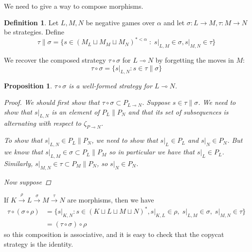 \documentclass[11pt]{article} %
\theoremstyle{plain} %
\newtheorem{proposition}[theorem]{Proposition}
\theoremstyle{definition} %
\newtheorem{definition}[theorem]{Definition}
\theoremstyle{exercisestyle}
\newcommand{\map}[3]{#2\xrightarrow{#1} #3}
\newcommand*\from{\colon}
\newcommand{\cmap}[3]{#1\from{}#2\to{}#3}
\renewcommand{\implies}{\multimap}
\newcommand{\comp}{\circ}
\newcommand{\cprd}{\sqcup}
\newcommand{\suchthat}{\;\colon\;}
\begin{document}
We need to give a way to compose morphisms.

\begin{definition}
  Let $L,M,N$ be negative games over $\alpha$ and let $\cmap{\sigma}{L}{M},\cmap{\tau}{M}{N}$ be strategies.  Define
  \[
    \tau\|\sigma=\{s\in(M_L\cprd M_M\cprd M_N)^{*<\alpha}\suchthat s\vert_{L,M}\in\sigma, s\vert_{M,N}\in \tau\}
  \]

  We recover the composed strategy $\tau\comp\sigma$ for $L\implies N$ by forgetting the moves in $M$:
  \[
    \tau\comp\sigma=\{s\vert_{L,N}\colon s\in\tau\|\sigma\}
  \]
\end{definition} 

\begin{proposition}
  $\tau\comp\sigma$ is a well-formed strategy for $L\implies N$.
  \begin{proof}
    We should first show that $\tau\circ\sigma\subset P_{L\implies N}$.  Suppose $s\in\tau\|\sigma$.  We need to show that $s\vert_{L,N}$ is an element of $P_L\|P_N$ and that its set of subsequences is alternating with respect to $\zeta_{P\implies N}$.  

    To show that $s\vert_{L,N}\in P_L\|P_N$, we need to show that $s\vert_L\in P_L$ and $s\vert_N\in P_N$.  But we know that $s\vert_{L,M}\in\sigma\subset P_L\|P_M$ so in particular we have that $s\vert_L\in P_L$.  Similarly, $s\vert_{M,N}\in\tau\subset P_M\|P_N$, so $s\vert_N\in P_N$.

    Now suppose 

  \end{proof}
\end{proposition}

  If $\map{\rho}{K}{L}\xrightarrow{\sigma}\map{\tau}{M}{N}$ are morphisms, then we have
  \begin{align*}
    \tau\comp(\sigma\comp\rho)&=\{s\vert_{K,N}\colon s\in(K\cprd L\cprd M\cprd N)^*, s\vert_{K,L}\in\rho,\;s\vert_{L,M}\in\sigma,\;s\vert_{M,N}\in\tau\}\\
      &= (\tau\comp\sigma)\comp\rho
  \end{align*}
  so this composition is associative, and it is easy to check that the copycat strategy is the identity.
      


\end{document}
